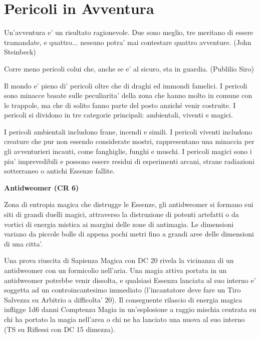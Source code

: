 \documentclass[a4paper,11pt,twoside,openany]{dndbook}
\begin{document}
\pagebreak

\section{Pericoli in Avventura}


\begin{quotebox}
		{Un'avventura e' un risultato ragionevole. Due sono meglio, tre meritano di essere tramandate, e quattro... nessuno potra' mai contestare quattro avventure. (John Steinbeck)}
\end{quotebox}


\label{pericoli-in-avventura}
\begin{quotebox}Corre meno pericoli colui che, anche se e' al sicuro, sta in guardia. (Publilio Siro)
\end{quotebox}
Il mondo e' pieno di' pericoli oltre che di draghi ed immondi famelici. I pericoli sono minacce basate sulle peculiarita' della zona che hanno molto in comune con le trappole, ma che di solito fanno parte del posto anziché venir costruite. I pericoli si dividono in tre categorie principali: ambientali, viventi e magici.

I pericoli ambientali includono frane, incendi e simili. I pericoli viventi includono creature che pur non essendo considerate mostri, rappresentano una minaccia per gli av­venturieri incauti, come fanghiglie, funghi e muschi. I pericoli magici sono i piu' imprevedibili e possono essere residui di esperimenti arcani, strane radiazioni sotterraneo o antichi Essenze fallite.

\textbf{Antidweomer (CR 6)}

Zona di entropia magica che distrugge le Essenze, gli antidweomer si formano sui siti di grandi duelli magici, attraverso la distruzione di potenti artefatti o da vortici di energia mistica ai margini delle zone di antimagia. Le dimensioni variano da piccole bolle di appena pochi metri fino a grandi aree delle dimensioni di una citta'. 

Una prova riuscita di Sapienza Magica con DC 20 rivela la vicinanza di un antidweomer con un formicolio nell'aria. Una magia attiva portata in un antidweomer potrebbe venir dissolta, e qualsiasi Essenza lanciata al suo interno e' soggetta ad un controincantesimo immediato (l'incantatore deve fare un Tiro Salvezza su Arbitrio a difficolta' 20). Il conseguente rilascio di energia magica infligge 1d6 danni Comptenza Magia in un'esplosione a raggio mischia centrata su chi ha portato la magia nell'area o chi ne ha lanciato una nuova al suo interno (TS su Riflessi con DC 15 dimezza).
\end{document}
